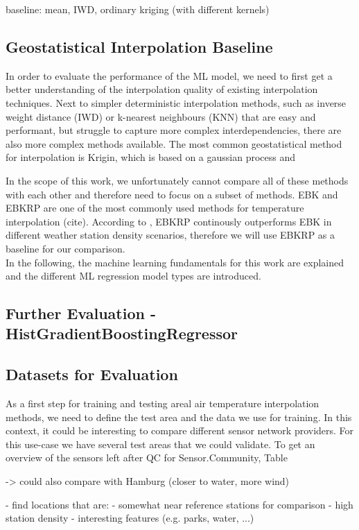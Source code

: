 baseline: mean, IWD, ordinary kriging (with different kernels)

\subsection{Geostatistical Interpolation Baseline}
In order to evaluate the performance of the ML model, we need to first get a better understanding of the interpolation quality of existing interpolation techniques. Next to simpler deterministic interpolation methods, such as inverse weight distance (IWD) or k-nearest neighbours (KNN) that are easy and performant, but struggle to capture more complex interdependencies, there are also more complex methods available. The most common geostatistical method for interpolation is Krigin, which is based on a gaussian process and 

In the scope of this work, we unfortunately cannot compare all of these methods with each other and therefore need to focus on a subset of methods. EBK and EBKRP are one of the most commonly used methods for temperature interpolation (cite). According to \cite{njoku2023effects}, EBKRP continously outperforms EBK in different weather station density scenarios, therefore we will use EBKRP as a baseline for our comparison.\\
In the following, the machine learning fundamentals for this work are explained and the different ML regression model types are introduced.


\subsection{Further Evaluation - HistGradientBoostingRegressor}

\subsection{Datasets for Evaluation}

As a first step for training and testing areal air temperature interpolation methods, we need to define the test area and the data we use for training. In this context, it could be interesting to compare different sensor network providers.
For this use-case we have several test areas that we could validate. To get an overview of the sensors left after QC for Sensor.Community, Table 

-> could also compare with Hamburg (closer to water, more wind)

- find locations that are:
  - somewhat near reference stations for comparison
  - high station density
  - interesting features (e.g. parks, water, ...)

